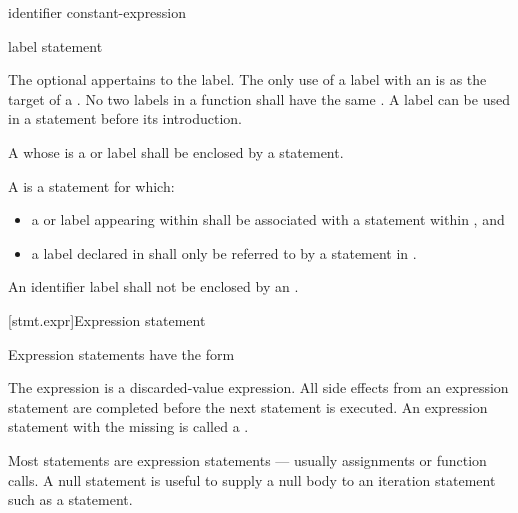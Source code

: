 \begin{bnf}
\br
     identifier \terminal{:}\br
      constant-expression \terminal{:}\br
      \terminal{:}
\end{bnf}

\begin{bnf}
\br
    label statement
\end{bnf}

The optional  appertains to the label.
%
The only use of a label with an  is
as the target of a .
%
No two labels in a function shall have the same .
A label can be used in a  statement
before its introduction.

\pnum
{}%
%
%
A 
whose  is a  or  label
shall be enclosed by a  statement.

\pnum
A  is a statement  for which:
\begin{itemize}
\item
  a  or  label appearing within  shall
  be associated with a  statement within
  , and
\item
  a label declared in  shall only be referred to by a
  statement in .
\end{itemize}

\pnum
An identifier label shall not be enclosed
by an .

[stmt.expr]{Expression statement}%

\pnum
Expression statements have the form
\begin{bnf}
\br
     \terminal{;}
\end{bnf}

The expression is
a discarded-value expression.
All
%
side effects from an expression statement
are completed before the next statement is executed.
%
An expression statement with the  missing is called
a .
\begin{note}
Most statements are expression statements --- usually assignments or
function calls. A null statement is useful to supply a null body to an
iteration statement such as a 
statement.
\end{note}

